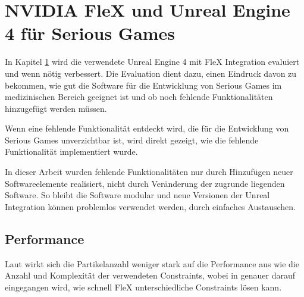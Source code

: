\chapter{NVIDIA FleX und Unreal Engine 4 für Serious Games}
\label{chap_Flex_Engine}

In Kapitel \ref{chap_Flex_Engine} wird die verwendete Unreal Engine 4 mit FleX Integration evaluiert und wenn nötig verbessert. Die Evaluation dient dazu, einen Eindruck davon zu bekommen, wie gut die Software für die Entwicklung von Serious Games im medizinischen Bereich geeignet ist und ob noch fehlende Funktionalitäten hinzugefügt werden müssen. 

Wenn eine fehlende Funktionalität entdeckt wird, die für die Entwicklung von Serious Games unverzichtbar ist, wird direkt gezeigt, wie die fehlende Funktionalität implementiert wurde.

In dieser Arbeit wurden fehlende Funktionalitäten nur durch Hinzufügen neuer Softwareelemente realisiert, nicht durch Veränderung der zugrunde liegenden Software. So bleibt die Software modular und neue Versionen der Unreal Integration können problemlos verwendet werden, durch einfaches Austauschen. 


\section{Performance}
\label{sec_performance}



Laut \cite{FlexD3D} wirkt sich die Partikelanzahl weniger stark auf die Performance aus wie die Anzahl und Komplexität der verwendeten Constraints, wobei in \cite{FlexD3D} genauer darauf eingegangen wird, wie schnell FleX unterschiedliche Constraints lösen kann.

